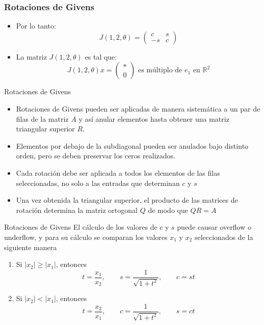 \documentclass{beamer}
\begin{document}
\begin{frame}
\frametitle{Rotaciones de Givens} 
\begin{itemize}
\item<1-> Por lo tanto:
$$
J(1,2,\theta) = \left(\begin{array}{cc}
                       c & s\\
		                  -s & c
                      \end{array}\right)
$$

\item<2->La matriz $J(1,2,\theta)$ es tal que:
$$
J(1,2,\theta)x = \left(\begin{array}{c}
                      *\\
		                  0
                      \end{array}\right) \mbox{ es m\'ultiplo de $e_1$ en $\mathbb{R}^2$}
$$
\end{itemize}  
\end{frame} 
\begin{frame}{Rotaciones de Givens}
  \begin{itemize}
   \item Rotaciones de Givens pueden ser aplicadas de manera sistem\'atica a un par de filas de la matriz $A$ y as\'i 
 anular elementos hasta obtener una matriz triangular superior $R$.
 \item<2-> Elementos por debajo de la subdiagonal pueden ser anulados bajo distinto orden, pero se 
 deben preservar los 
 ceros realizados.
 \item<3-> Cada rotaci\'on debe ser aplicada a todos los elementos de las filas seleccionadas, no solo a las entradas que
 determinan $c$ y $s$
 \item<4-> Una vez obtenida la triangular superior, el producto de las matrices de rotaci\'on determina la matriz 
 ortogonal $Q$ de modo que $QR=A$
  \end{itemize}
 \end{frame}
 \begin{frame}{Rotaciones de Givens}
  El c\'alculo de los valores de $c$ y $s$ puede causar overflow o underflow, y para su c\'alculo se comparan los 
 valores $x_1$ y $x_2$ seleccionados de la siguiente manera
 \begin{enumerate}
  \item<2-> Si $|x_2|\geq|x_1|$, entonces
  $$
  t = \dfrac{x_1}{x_2}, \qquad s=\dfrac{1}{\sqrt{1+t^2}}, \qquad c=st
  $$
  \item<3-> Si $|x_2|<|x_1|$, entonces
  $$
  t = \dfrac{x_2}{x_1}, \qquad c=\dfrac{1}{\sqrt{1+t^2}}, \qquad s=ct
  $$
 \end{enumerate}
 \end{frame}
\end{document}
